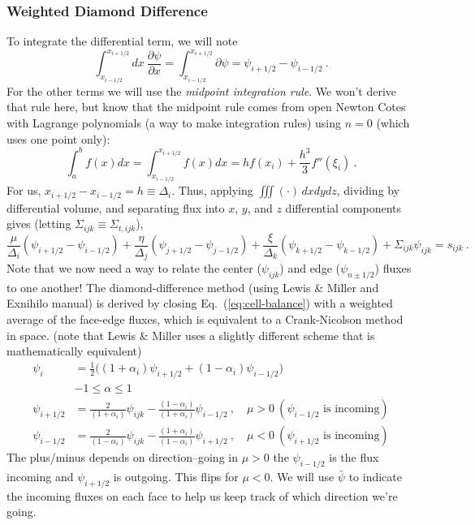 \documentclass[12pt]{article}
\newcommand{\Di}{\ensuremath{\Delta_i}}
\newcommand{\Dj}{\ensuremath{\Delta_j}}
\newcommand{\Dk}{\ensuremath{\Delta_k}}
\begin{document}
\subsubsection*{Weighted Diamond Difference}
To integrate the differential term, we will note
\[
\int_{x_{i-1/2}}^{x_{i+1/2}} dx \:\frac{\partial \psi}{\partial x}  =
\int_{x_{i-1/2}}^{x_{i+1/2}} \partial \psi = \psi_{i+1/2} - \psi_{i-1/2} \:.
\]
For the other terms we will use the \textit{midpoint integration rule}. We won't derive that rule here, but know that the midpoint rule comes from open Newton Cotes with Lagrange polynomials (a way to make integration rules) using $n=0$ (which uses one point only):
\[\int_a^b f(x)dx = \int_{x_{i-1/2}}^{x_{i+1/2}} f(x)dx = hf(x_i) + \frac{h^3}{3}f''(\xi_i)\:.\]
For us, $x_{i+1/2} - x_{i-1/2} = h \equiv \Di$. Thus, applying $\iiint(\cdot)\,dxdydz$, dividing by differential volume, and separating flux into $x$, $y$, and $z$ differential components gives (letting $\Sigma_{ijk} \equiv \Sigma_{t,ijk}$),
\begin{equation}
  \frac{\mu}{\Delta_i}(\psi_{i+1/2}-\psi_{i-1/2}) +
  \frac{\eta}{\Dj}(\psi_{j+1/2}-\psi_{j-1/2}) +
  \frac{\xi}{\Dk}(\psi_{k+1/2}-\psi_{k-1/2}) + \Sigma_{ijk}\psi_{ijk} = s_{ijk}\:.
  \label{eq:cell-balance}
\end{equation}
Note that we now need a way to relate the center ($\psi_{ijk}$) and edge ($\psi_{n\pm 1/2}$) fluxes to one another!
The diamond-difference method (using Lewis \& Miller and Exnihilo manual) is derived by closing
Eq.~(\ref{eq:cell-balance}) with a weighted average of the face-edge fluxes, which is
equivalent to a Crank-Nicolson method in space. 
(note that Lewis \& Miller uses a slightly different scheme that is mathematically equivalent)
\begin{align*}
\psi_{i} &= \frac{1}{2}\bigl((1+\alpha_i)\psi_{i+1/2}+(1-\alpha_i)\psi_{i-1/2}\bigr)\\
& -1 \leq \alpha \leq 1\\
\psi_{i+1/2} &= \frac{2}{(1+\alpha_i)}\psi_{ijk}-
    \frac{(1-\alpha_i)}{(1+\alpha_i)}\psi_{i-1/2}\:,\quad \mu>0\:(\psi_{i-1/2}\text{ is incoming})\\
\psi_{i-1/2} &= \frac{2}{(1-\alpha_i)}\psi_{ijk}-
    \frac{(1+\alpha_i)}{(1-\alpha_i)}\psi_{i+1/2}\:,\quad \mu<0 \:(\psi_{i+1/2}\text{ is incoming})
\end{align*}
The plus/minus depends on direction--going in $\mu>0$ the $\psi_{i-1/2}$ is the flux incoming and $\psi_{i+1/2}$ is outgoing. This flips for $\mu<0$. We will use $\bar{\psi}$ to indicate the incoming fluxes on each face to help us keep track of which direction we're going.
\end{document}
